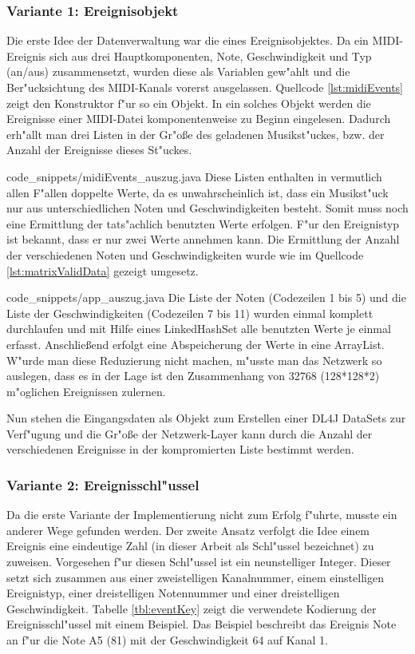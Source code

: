{\subsubsection{Variante 1: Ereignisobjekt}
Die erste Idee der Datenverwaltung war die eines Ereignisobjektes. Da ein MIDI-Ereignis sich aus drei Hauptkomponenten, Note, Geschwindigkeit und Typ (an/aus) zusammensetzt, wurden diese als Variablen gew"ahlt und die Ber"ucksichtung des MIDI-Kanals vorerst ausgelassen. Quellcode \ref{lst:midiEvents} zeigt den Konstruktor f"ur so ein Objekt. In ein solches Objekt werden die Ereignisse einer MIDI-Datei komponentenweise zu Beginn eingelesen. Dadurch erh"allt man drei Listen in der Gr"o{\ss}e des geladenen Musikst"uckes, bzw. der Anzahl der Ereignisse dieses St"uckes.

{code_snippets/midiEvents_auszug.java}
Diese Listen enthalten in vermutlich allen F"allen doppelte Werte, da es unwahrscheinlich ist, dass ein Musikst"uck nur aus unterschiedlichen Noten und Geschwindigkeiten besteht. Somit muss noch eine Ermittlung der tats"achlich benutzten Werte erfolgen. F"ur den Ereignistyp ist bekannt, dass er nur zwei Werte annehmen kann. Die Ermittlung der Anzahl der verschiedenen Noten und Geschwindigkeiten wurde wie im Quellcode \ref{lst:matrixValidData} gezeigt umgesetz.

{code_snippets/app_auszug.java}
Die Liste der Noten (Codezeilen 1 bis 5) und die Liste der Geschwindigkeiten (Codezeilen 7 bis 11) wurden einmal komplett durchlaufen und mit Hilfe eines LinkedHashSet alle benutzten Werte je einmal erfasst. Anschlie{\ss}end erfolgt eine Abspeicherung der Werte in eine ArrayList. W"urde man diese Reduzierung nicht machen, m"usste man das Netzwerk so auslegen, dass es in der Lage ist den Zusammenhang von 32768 (128*128*2) m"oglichen Ereignissen zulernen.

Nun stehen die Eingangsdaten als Objekt zum Erstellen einer DL4J DataSets zur Verf"ugung und die Gr"o{\ss}e der Netzwerk-Layer kann durch die Anzahl der verschiedenen Ereignisse in der kompromierten Liste bestimmt werden.

\subsubsection{Variante 2: Ereignisschl"ussel}
Da die erste Variante der Implementierung nicht zum Erfolg f"uhrte, musste ein anderer Wege gefunden werden. Der zweite Ansatz verfolgt die Idee einem Ereignis eine eindeutige Zahl (in dieser Arbeit als Schl"ussel bezeichnet) zu zuweisen. Vorgesehen f"ur diesen Schl"ussel ist ein neunstelliger Integer. Dieser setzt sich zusammen aus einer zweistelligen Kanalnummer, einem einstelligen Ereignistyp, einer dreistelligen Notennummer und einer dreistelligen Geschwindigkeit. Tabelle \ref{tbl:eventKey} zeigt die verwendete Kodierung der Ereignisschl"ussel mit einem Beispiel. Das Beispiel beschreibt das Ereignis {\glqq}Note an{\grqq} f"ur die Note A5 (81) mit der Geschwindigkeit 64 auf Kanal 1.

}
